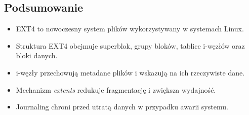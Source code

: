 \subsection{Podsumowanie}
\begin{itemize}
    \item EXT4 to nowoczesny system plików wykorzystywany w systemach Linux.
    \item Struktura EXT4 obejmuje superblok, grupy bloków, tablice i-węzłów oraz bloki danych.
    \item i-węzły przechowują metadane plików i wskazują na ich rzeczywiste dane.
    \item Mechanizm \textit{extents} redukuje fragmentację i zwiększa wydajność.
    \item Journaling chroni przed utratą danych w przypadku awarii systemu.
\end{itemize}
